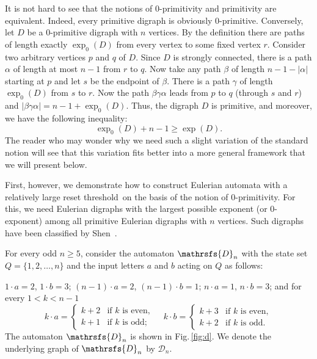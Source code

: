 \documentclass[12pt,twoside]{article}
\newcommand{\reth}{reset threshold}
\begin{document}
It is not hard to see that the notions of 0-primitivity and primitivity are
equivalent. Indeed, every primitive digraph is obviously 0-primitive.
Conversely, let $D$ be a 0-primitive digraph with $n$ vertices. By the
definition there are paths of length exactly $\exp_0(D)$ from every vertex to
some fixed vertex $r$. Consider two arbitrary vertices $p$ and $q$ of $D$.
Since $D$ is strongly connected, there is a path $\alpha$ of length at most $n
- 1$ from $r$ to $q$. Now take any path $\beta$ of length $n - 1 - |\alpha|$
starting at $p$ and let $s$ be the endpoint of $\beta$. There is a path
$\gamma$ of length $\exp_0(D)$ from $s$ to $r$. Now the path
$\beta\gamma\alpha$ leads from $p$ to $q$ (through $s$ and $r$) and
$|\beta\gamma\alpha|=n - 1 + \exp_0(D)$. Thus, the digraph $D$ is primitive,
and moreover, we have the following inequality:
\begin{equation}
\label{second inequality} \exp_0(D) + n - 1 \geq \exp(D).
\end{equation}
The reader who may wonder why we need such a slight variation of the standard
notion will see that this variation fits better into a more general framework
that we will present below.

First, however, we demonstrate how to construct Eulerian automata with a
relatively large \reth\ on the basis of the notion of 0-primitivity. For this,
we need Eulerian digraphs with the largest possible exponent (or 0-exponent)
among all primitive Eulerian digraphs with $n$ vertices. Such digraphs have
been classified by Shen~\cite{Shen00}.

For every odd $n \geq 5$, consider the automaton $\mathrsfs{D}_n$ with the
state set $Q=\{1,2,\dots,n\}$ and the input letters $a$ and $b$ acting on $Q$
as follows:

$ 1 \cdot a = 2$, $1 \cdot b = 3$; $(n - 1) \cdot a = 2$, $(n - 1) \cdot b =
1$; $n \cdot a = 1$, $n \cdot b = 3$; and for every $1 < k < n - 1$
$$k \cdot a=\begin{cases}
k + 2 &\text{if } k \text{ is even},\\
k + 1 &\text{if } k \text{ is odd};
\end{cases}\quad
k \cdot b=\begin{cases}
k + 3 &\text{if } k \text{ is even},\\
k + 2 &\text{if } k \text{ is odd}.
\end{cases}$$
The automaton $\mathrsfs{D}_n$ is shown in Fig.\,\ref{fig:d}. We denote the
underlying graph of $\mathrsfs{D}_n$ by $\mathcal{D}_n$.
\end{document}
